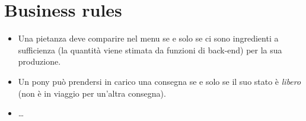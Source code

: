 \section{Business rules} \label{sec:businessrules}
\begin{itemize}
\item Una pietanza deve comparire nel menu se e solo se ci sono ingredienti a sufficienza (la quantità viene stimata da funzioni di back-end) per la sua produzione.
\item Un pony può prendersi in carico una consegna se e solo se il suo stato è {\it libero} (non è in viaggio per un'altra consegna).
\item \ldots
\end{itemize}
